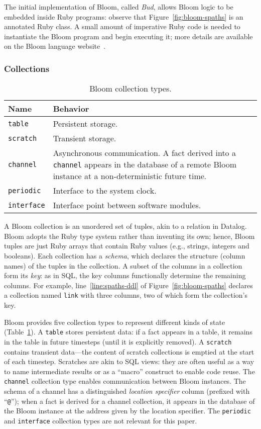 The initial implementation of Bloom, called \emph{Bud}, allows Bloom logic to
be embedded inside Ruby programs: observe that Figure~\ref{fig:bloom-spaths} is
an annotated Ruby class. A small amount of imperative Ruby code is needed to
instantiate the Bloom program and begin executing it; more details are available
on the Bloom language website~\cite{bloom}.

\subsubsection{Collections}
\begin{table}[t]
\begin{tabular}{|l|p{2.32in}|}
\hline
\textbf{Name} & \textbf{Behavior }\\
\hline
\texttt{table} & Persistent storage.\\
\texttt{scratch} & Transient storage.\\
\texttt{channel} & Asynchronous communication. A fact derived into a \texttt{channel} appears in the
database of a remote Bloom instance at a non-deterministic future time.\\
\texttt{periodic} & Interface to the system clock.\\
\texttt{interface} & Interface point between software modules.\\
\hline
\end{tabular}
\caption{Bloom collection types.}
\label{tbl:bloom-collections}
\end{table}

A Bloom collection is an unordered set of tuples, akin to a relation in
Datalog. Bloom adopts the Ruby type system rather than inventing its own; hence,
Bloom tuples are just Ruby arrays that contain Ruby values (e.g., strings,
integers and booleans). Each collection has a \emph{schema}, which declares the
structure (column names) of the tuples in the collection. A subset of the
columns in a collection form its \emph{key}: as in SQL, the key columns
functionally determine the remaining columns. For example,
line~\ref{line:spaths-ddl} of Figure~\ref{fig:bloom-spaths} declares a
collection named \texttt{link} with three columns, two of which form the
collection's key.

Bloom provides five collection types to represent different kinds of state
(Table~\ref{tbl:bloom-collections}). A \texttt{table} stores persistent data: if
a fact appears in a table, it remains in the table in future timesteps (until it
is explicitly removed). A \texttt{scratch} contains transient data---the content
of scratch collections is emptied at the start of each timestep. Scratches are
akin to SQL views: they are often useful as a way to name intermediate results
or as a ``macro'' construct to enable code reuse. The \texttt{channel}
collection type enables communication between Bloom instances. The schema of a
channel has a distinguished \emph{location specifier} column (prefixed with
``\texttt{@}''); when a fact is derived for a channel collection, it appears in
the database of the Bloom instance at the address given by the location
specifier. The \texttt{periodic} and \texttt{interface} collection types are not
relevant for this paper.

